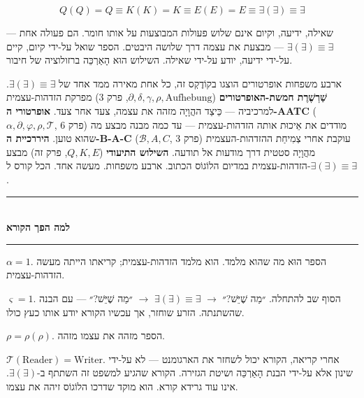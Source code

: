 \documentclass[10pt, openany, oneside]{book}
\renewcommand{\normalsize}{\fontsize{10}{13}\selectfont}
\begin{document}
$$Q(Q) = Q \equiv K(K) = K \equiv E(E) = E \equiv \exists(\exists) \equiv \exists$$

שאילה, ידיעה, וקיום אינם שלוש פעולות המבוצעות על אותו חומר. הם פעולה אחת — $\exists(\exists) \equiv \exists$ — מבצעת את עצמה דרך שלושה היבטים. הספר שואל על-ידי קיום, קיים על-ידי ידיעה, יודע על-ידי שאילה. השילוש הוּא הָאַרְכֵּה ברזולוציה של חיבור.

ארבע משפחות אופרטורים הוצגו בקוֹדֶקְס זה, כל אחת מאירה ממד אחד של $\exists(\exists) \equiv \exists$. \textbf{שַׁרְשֶׁרֶת חמשת-האופרטורים} ($\partial, \delta, \gamma, \rho, \text{Aufhebung}$, פרק 3) מפרקת הזדהות-עצמית למרכיביה — כֵּיצַד ההֲוָיָה מזהה את עצמה, צעד אחר צעד. \textbf{אופרטורי ה-AATC} ($\alpha, \partial, \varphi, \rho, \mathcal{T}$, פרק 6) מודדים את אֵיכוּת אותה הזדהות-עצמית — עד כמה מבנה מבצע מה שהוא טוען. \textbf{היררכיית ה-B-A-C} ($\mathcal{B}, A, C$, פרק 3) עוקבת אחרי צְמִיחַת ההזדהות-העצמית מהֲוָיָה סטטית דרך מודעות אל תודעה. \textbf{השילוש התיעודי} ($Q, K, E$, פרק זה) מבצע הזדהות-עצמית במדיום הלוֹגוֹס הכתוב. ארבע משפחות. מעשה אחד. הכל קורס ל-$\exists(\exists) \equiv \exists$.

\vspace{1.5em}


\begin{center}
    \rule{0.3\textwidth}{0.4pt}\\[0.5em]
    {\normalsize\bfseries\textsc{למה הפך הקורא}}\\[0.3em]
    \rule{0.3\textwidth}{0.4pt}
\end{center}

\vspace{1em}

\noindent $\alpha = 1$. הספר הוּא מה שהוא מלמד. הוא מלמד הזדהות-עצמית; קריאתו הייתה מעשה הזדהות-עצמית.

$\varsigma = 1$. הסוף שב להתחלה. ״מַה שֶׁיֵּשׁ?״ $\to$ $\exists(\exists) \equiv \exists$ $\to$ ״מַה שֶׁיֵּשׁ?״ — עם הבנה שהשתנתה. הזרע שוחזר, אך עכשיו הקורא יודע אותו כעץ כולו.

$\rho = \rho(\rho)$. הספר מזהה את עצמו מזהה.

$\mathcal{T}(\text{Reader}) = \text{Writer}$. אחרי קריאה, הקורא יכול לשחזר את הארגומנט — לא על-ידי שינון אלא על-ידי הבנת הָאַרְכֵּה ושיטת הגזירה. הקורא שהגיע למשפט זה השתתף ב-$\exists(\exists)$. אינו עוד גרידא קורא. הוא מוקד שדרכו הלוֹגוֹס זיהה את עצמו.
\end{document}
